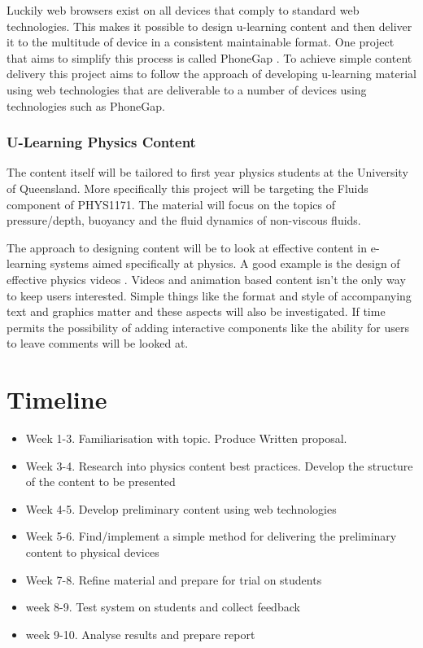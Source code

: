 \documentclass[12pt,a4paper]{article}  %
\begin{document}
Luckily web browsers exist on all devices that comply to standard web
technologies. This makes it possible to design u-learning content and
then deliver it to the multitude of device in a consistent
maintainable format. One project that aims to simplify this process is
called PhoneGap \cite{phonegap}. To achieve simple content delivery
this project aims to follow the approach of developing u-learning
material using web technologies that are deliverable to a number of
devices using technologies such as PhoneGap.

\subsubsection*{U-Learning Physics Content}

The content itself will be tailored to first year physics students at
the University of Queensland. More specifically this project will be
targeting the Fluids component of PHYS1171. The material will focus
on the topics of pressure/depth, buoyancy and the fluid dynamics of
non-viscous fluids. 

The approach to designing content will be to look at effective content
in e-learning systems aimed specifically at physics. A good example is
the design of effective physics videos \cite{vid}. Videos and
animation based content isn't the only way to keep users interested.
Simple things like the format and style of accompanying text and
graphics matter and these aspects will also be investigated.  If time
permits the possibility of adding interactive components like the
ability for users to leave comments will be looked at.

\section*{Timeline}

\begin{itemize}
\item Week 1-3. Familiarisation with topic. Produce Written proposal.  
\item Week 3-4. Research into physics content best
  practices.  Develop the structure of the content to be presented
\item Week 4-5. Develop preliminary content using web technologies
\item Week 5-6. Find/implement a simple method for delivering the
  preliminary content to physical devices 
\item Week 7-8. Refine material and prepare for trial on students 
\item week 8-9. Test system on students and collect feedback 
\item week 9-10. Analyse results and prepare report
\end{itemize}



\end{document}
